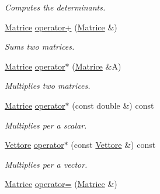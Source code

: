 \begin{DoxyCompactItemize}
\begin{DoxyCompactList}\small\item\em \-Computes the determinants. \end{DoxyCompactList}\item 
\hypertarget{classMatrice_a1f8738463e0e7eb8be57bf909bcd7ce0}{\hyperlink{classMatrice}{\-Matrice} \hyperlink{classMatrice_a1f8738463e0e7eb8be57bf909bcd7ce0}{operator+} (\hyperlink{classMatrice}{\-Matrice} \&)}\label{classMatrice_a1f8738463e0e7eb8be57bf909bcd7ce0}

\begin{DoxyCompactList}\small\item\em \-Sums two matrices. \end{DoxyCompactList}\item 
\hypertarget{classMatrice_aa448fbb42e5073bb139ec73ce86f852f}{\hyperlink{classMatrice}{\-Matrice} \hyperlink{classMatrice_aa448fbb42e5073bb139ec73ce86f852f}{operator$\ast$} (\hyperlink{classMatrice}{\-Matrice} \&\-A)}\label{classMatrice_aa448fbb42e5073bb139ec73ce86f852f}

\begin{DoxyCompactList}\small\item\em \-Multiplies two matrices. \end{DoxyCompactList}\item 
\hypertarget{classMatrice_ab0ddc1000224f226a80a9efeabec28cd}{\hyperlink{classMatrice}{\-Matrice} \hyperlink{classMatrice_ab0ddc1000224f226a80a9efeabec28cd}{operator$\ast$} (const double \&) const }\label{classMatrice_ab0ddc1000224f226a80a9efeabec28cd}

\begin{DoxyCompactList}\small\item\em \-Multiplies per a scalar. \end{DoxyCompactList}\item 
\hypertarget{classMatrice_abc91a90deb2e320dbbf546014d757631}{\hyperlink{classVettore}{\-Vettore} \hyperlink{classMatrice_abc91a90deb2e320dbbf546014d757631}{operator$\ast$} (const \hyperlink{classVettore}{\-Vettore} \&) const }\label{classMatrice_abc91a90deb2e320dbbf546014d757631}

\begin{DoxyCompactList}\small\item\em \-Multiplies per a vector. \end{DoxyCompactList}\item 
\hypertarget{classMatrice_a9d7b0347594ca071c5a3048d2d3002cb}{\hyperlink{classMatrice}{\-Matrice} \hyperlink{classMatrice_a9d7b0347594ca071c5a3048d2d3002cb}{operator=} (\hyperlink{classMatrice}{\-Matrice} \&)}\label{classMatrice_a9d7b0347594ca071c5a3048d2d3002cb}


\end{DoxyCompactItemize}
